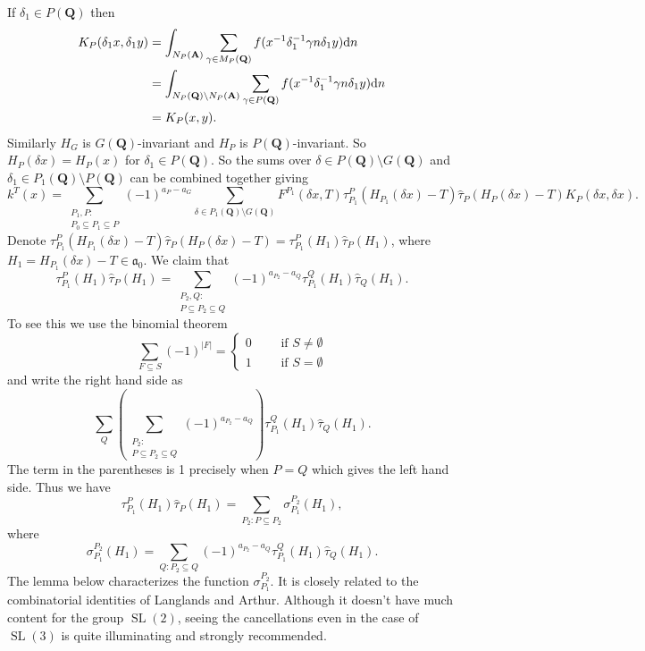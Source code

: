 \documentclass[11pt]{amsart}
\def\apg{a_{P} - a_{G}}
\def\A{\mathbf A}
\def\Q{\mathbf Q}
\def\aaa{\mathfrak a}
\def\d{\text d}
\def\bs{\setminus} 			%
\def\mod#1{\lvert #1 \rvert} %
\def\se{\subseteq}
\def\sl{\operatorname{SL}}
\theoremstyle{remark}
\begin{document}
If $\delta_1 \in P(\Q)$ then
\begin{align*}
	K_P(\delta_1 x, \delta_1 y) & = \int_{N_P(\A)} \sum_{\gamma \in M_P(\Q)} f(x^{-1}\delta_1^{-1} 
			\gamma n \delta_1 y) \d n \\
			& = \int_{N_P(\Q)\bs N_P(\A)} \sum_{\gamma \in P(\Q)} f(x^{-1} \delta_1^{-1} \gamma n \delta_1 y) \d n \\
			& = K_P(x, y).
\end{align*}
Similarly $H_G$ is $G(\Q)$-invariant and $H_P$ is $P(\Q)$-invariant. So $H_P(\delta x) = H_P(x)$ for $\delta_1 \in P(\Q)$. So the sums over $\delta \in P(\Q)\bs G(\Q)$ and $\delta_1 \in P_1(\Q)\bs P(\Q)$ can be combined together giving 
\[ k^T(x) = \sum_{\substack{P_1, P : \\ P_0 \se P_1 \se P}} (-1)^{\apg} \sum_{\delta \in P_1(\Q)\bs G(\Q)}
			F^{P_1}(\delta x, T) \tau_{P_1}^P(H_{P_1}(\delta x) - T) \hat\tau_P(H_P(\delta x) - T) 
			K_P(\delta x, \delta x). \]
Denote $\tau_{P_1}^P(H_{P_1}(\delta x) - T) \hat\tau_P(H_P(\delta x) - T) = \tau_{P_1}^P(H_1) \hat\tau_P(H_1)$, where $H_1 = H_{P_1}(\delta x) - T \in \aaa_0$. We claim that 
\[ \tau_{P_1}^P(H_1)\hat\tau_P(H_1) = \sum_{\substack{P_2, Q :\\ P \se P_2 \se Q}} (-1)^{a_{P_2} - a_Q}  
		\tau_{P_1}^Q(H_1) \hat\tau_Q(H_1). \]
To see this we use the binomial theorem
\begin{equation} \label{binom}
	\sum_{F \se S} (-1)^{\mod{F}} = \begin{cases} 0 \qquad \text{ if } S \neq \emptyset \\
			1 \qquad \text{ if } S = \emptyset \end{cases}
\end{equation}
and write the right hand side as
\[ \sum_Q \left( \sum_{\substack{ P_2 : \\ P \se P_2 \se Q}} (-1)^{a_{P_2} - a_Q} \right) \tau_{P_1}^Q(H_1) \hat\tau_Q(H_1). \]
The term in the parentheses is 1 precisely when $P=Q$ which gives the left hand side. Thus we have
\[ \tau_{P_1}^P(H_1) \hat\tau_P(H_1) = \sum_{P_2 : P \se P_2} \sigma_{P_1}^{P_2}(H_1), \]
where 
\[ \sigma_{P_1}^{P_2}(H_1) = \sum_{Q : P_2 \se Q} (-1)^{a_{P_2} - a_Q} \tau_{P_1}^Q(H_1) \hat\tau_Q(H_1). \]
The lemma below characterizes the function $\sigma_{P_1}^{P_2}$. It is closely related to the combinatorial identities of Langlands and Arthur. Although it doesn't have much content for the group $\sl(2)$, seeing the cancellations even in the case of $\sl(3)$ is quite illuminating and strongly recommended. 
\end{document}
